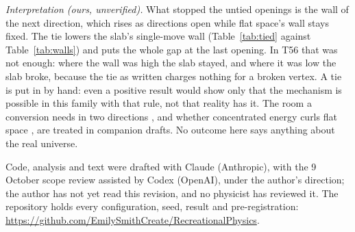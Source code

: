 \documentclass[aps,pre,10pt,twocolumn,superscriptaddress,nofootinbib]{revtex4-2}
\begin{document}
\emph{Interpretation (ours, unverified).} What stopped the untied openings is the wall of the next direction, which
rises as directions open while flat space's wall stays fixed. The tie lowers the slab's single-move wall
(Table~\ref{tab:tied} against Table~\ref{tab:walls}) and puts the whole gap at the last opening. In T56 that was not
enough: where the wall was high the slab stayed, and where it was low the slab broke, because the tie as written
charges nothing for a broken vertex. A tie is put in by hand: even a positive result would show only that the
mechanism is possible in this family with that rule, not that reality has it. The room a conversion needs in two directions \cite{paper3}, and whether
concentrated energy curls flat space \cite{paper4}, are treated in companion drafts. No outcome here says anything
about the real universe.

\begin{acknowledgments}
Code, analysis and text were drafted with Claude (Anthropic), with the 9 October scope review assisted by Codex
(OpenAI), under the author's direction; the author has not yet read this revision, and no physicist has
reviewed it. The repository holds
every configuration, seed, result and pre-registration:
\url{https://github.com/EmilySmithCreate/RecreationalPhysics}.
\end{acknowledgments}
\end{document}
